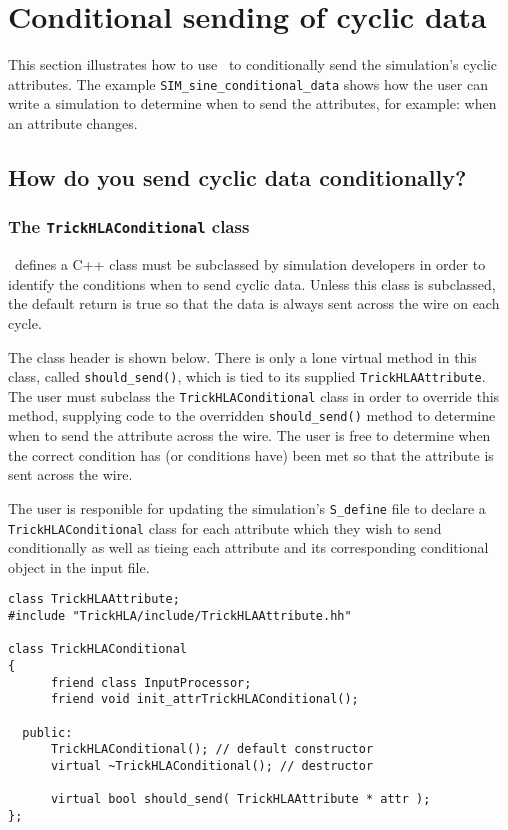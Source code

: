 \chapter{Conditional sending of cyclic data}
\label{sec:hla-conditional}

This section illustrates how to use \TrickHLA\ to
conditionally send the simulation's cyclic attributes.
The example {\tt SIM\_sine\_conditional\_data} shows how the user can write a simulation
to determine when to send the attributes, for example: when an attribute changes.

\section{How do you send cyclic data conditionally?}
\subsection{The {\tt TrickHLAConditional} class}

\TrickHLA\ defines a C++ class must be subclassed by simulation developers
in order to identify the conditions when to send cyclic data. Unless this class
is subclassed, the default return is true so that the data is always sent across
the wire on each cycle.

The class header is shown below.
There is only a lone virtual method in this class, called {\tt should\_send()},
which is tied to its supplied {\tt TrickHLAAttribute}. The user must subclass the
{\tt TrickHLAConditional} class in order to override this method, supplying code to
the overridden {\tt should\_send()} method to determine when to send the attribute
across the wire. The user is free to determine when the correct condition has
(or conditions have) been met so that the attribute is sent across the wire.

The user is responible for updating the simulation's {\tt S\_define} file
to declare a {\tt TrickHLAConditional} class for each attribute which they wish to
send conditionally as well as tieing each attribute and its corresponding
conditional object in the input file.

\begin{lstlisting}[caption={The {\tt TrickHLAConditional} class},label={list:trickhla-conditional}]
class TrickHLAAttribute;
#include "TrickHLA/include/TrickHLAAttribute.hh"

class TrickHLAConditional
{
      friend class InputProcessor;
      friend void init_attrTrickHLAConditional();

  public:
      TrickHLAConditional(); // default constructor
      virtual ~TrickHLAConditional(); // destructor

      virtual bool should_send( TrickHLAAttribute * attr );
};
\end{lstlisting}

